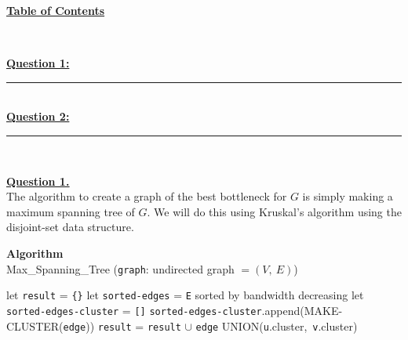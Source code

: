 \documentclass[12pt]{article}
\begin{document}
\begin{center}
	\hypertarget{toc}{\LARGE \underline{\textbf{Table of Contents}}}\\
\end{center}

\hyperlink{1}{\textbf{Question 1:}}
\vspace{1mm}
\hrule
\vspace{1mm} \leavevmode \\

\hyperlink{2}{\textbf{Question 2:}}
\vspace{1mm}
\hrule
\vspace{1mm} \leavevmode \\

\newpage

\hyperlink{toc}{\hypertarget{1}{\LARGE \underline{\textbf{Question 1.}}}}\\

The algorithm to create a graph of the best bottleneck for $G$ is simply making a maximum spanning tree of $G$.
We will do this using Kruskal's algorithm using the disjoint-set data structure.
\begin{algorithm}
	\caption*{\textbf{Algorithm}\\Max\_Spanning\_Tree \big(\texttt{graph}: undirected graph $= (V,\ E)$\big)}\label{alg:cap}
	\begin{algorithmic}[1]
		\State let \texttt{result} = \texttt{\{\}}
		\State let \texttt{sorted-edges} = \texttt{E} sorted by bandwidth decreasing
		\State let \texttt{sorted-edges-cluster} = \texttt{[]}
		\State
		  \State \texttt{sorted-edges-cluster}.append\big(MAKE-CLUSTER(\texttt{edge})\big)
		\EndFor
		\State
				\State \texttt{result} = \texttt{result} $\cup$ \texttt{edge}
				\State UNION(\texttt{u}.cluster,\ \texttt{v}.cluster)
			\EndIf
		\EndFor
    \State
		\State{}
	\end{algorithmic}
\end{algorithm}
\end{document}
